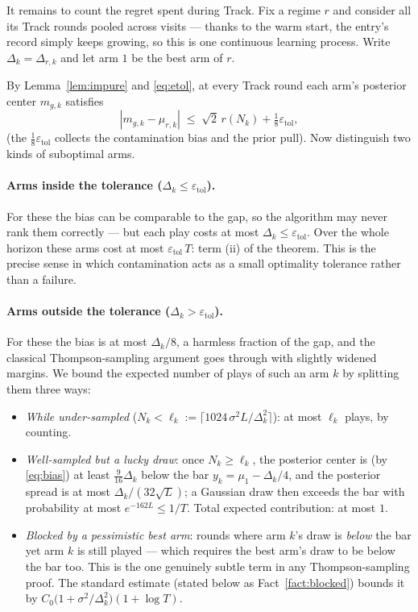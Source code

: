 \documentclass[11pt]{article}
\newcommand{\etol}{\varepsilon_{\mathrm{tol}}}
\begin{document}
It remains to count the regret spent during Track. Fix a regime $r$ and consider all its Track rounds pooled across visits --- thanks to the warm start, the entry's record simply keeps growing, so this is one continuous learning process. Write $\Delta_k=\Delta_{r,k}$ and let arm $1$ be the best arm of $r$.

By Lemma~\ref{lem:impure} and \eqref{eq:etol}, at every Track round each arm's posterior center $m_{g,k}$ satisfies
\begin{equation}
    |m_{g,k}-\mu_{r,k}|\;\le\;\sqrt2\,r(N_k)+\tfrac18\etol ,
    \label{eq:bias}
\end{equation}
(the $\tfrac18\etol$ collects the contamination bias and the prior pull). Now distinguish two kinds of suboptimal arms.

\paragraph{Arms inside the tolerance ($\Delta_k\le\etol$).}
For these the bias can be comparable to the gap, so the algorithm may never rank them correctly --- but each play costs at most $\Delta_k\le\etol$. Over the whole horizon these arms cost at most $\etol\,T$: term (ii) of the theorem. This is the precise sense in which contamination acts as a small optimality tolerance rather than a failure.

\paragraph{Arms outside the tolerance ($\Delta_k>\etol$).}
For these the bias is at most $\Delta_k/8$, a harmless fraction of the gap, and the classical Thompson-sampling argument goes through with slightly widened margins. We bound the expected number of plays of such an arm $k$ by splitting them three ways:
\begin{itemize}[leftmargin=1.6em]
\item \emph{While under-sampled} ($N_k<\ell_k:=\lceil1024\,\sigma^2L/\Delta_k^2\rceil$): at most $\ell_k$ plays, by counting.
\item \emph{Well-sampled but a lucky draw}: once $N_k\ge\ell_k$, the posterior center is (by \eqref{eq:bias}) at least $\tfrac{9}{16}\Delta_k$ below the bar $y_k=\mu_1-\Delta_k/4$, and the posterior spread is at most $\Delta_k/(32\sqrt L)$; a Gaussian draw then exceeds the bar with probability at most $e^{-162L}\le1/T$. Total expected contribution: at most $1$.
\item \emph{Blocked by a pessimistic best arm}: rounds where arm $k$'s draw is \emph{below} the bar yet arm $k$ is still played --- which requires the best arm's draw to be below the bar too. This is the one genuinely subtle term in any Thompson-sampling proof. The standard estimate (stated below as Fact~\ref{fact:blocked}) bounds it by $C_0\bigl(1+\sigma^2/\Delta_k^2\bigr)(1+\log T)$.
\end{itemize}
\end{document}
